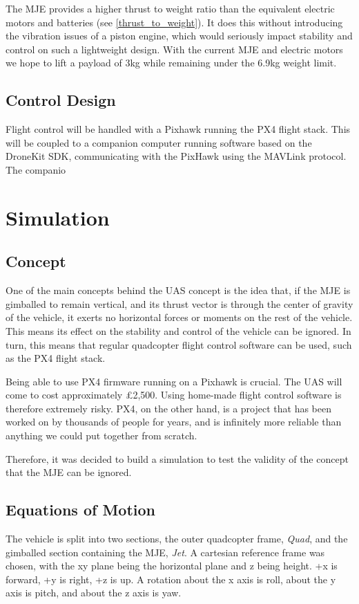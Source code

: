 \documentclass[11pt]{article}
\begin{document}
The MJE provides a higher thrust to weight ratio than the equivalent electric motors and batteries (see \ref{thrust_to_weight}). It does this without introducing the vibration issues of a piston engine, which would seriously impact stability and control on such a lightweight design. With the current MJE and electric motors we hope to lift a payload of 3kg while remaining under the 6.9kg weight limit.
\subsection{Control Design}
Flight control will be handled with a Pixhawk running the PX4 flight stack. This will be coupled to a companion computer running software based on the DroneKit SDK, communicating with the PixHawk using the MAVLink protocol. The companio

\section{Simulation}
\subsection{Concept}
One of the main concepts behind the UAS concept is the idea that, if the MJE is gimballed to remain vertical, and its thrust vector is through the center of gravity of the vehicle, it exerts no horizontal forces or moments on the rest of the vehicle. This means its effect on the stability and control of the vehicle can be ignored. In turn, this means that regular quadcopter flight control software can be used, such as the PX4 flight stack.

Being able to use PX4 firmware running on a Pixhawk is crucial. The UAS will come to cost approximately \pounds2,500. Using home-made flight control software is therefore extremely risky. PX4, on the other hand, is a project that has been worked on by thousands of people for years, and is infinitely more reliable than anything we could put together from scratch.

Therefore, it was decided to build a simulation to test the validity of the concept that the MJE can be ignored.

\subsection{Equations of Motion}
The vehicle is split into two sections, the outer quadcopter frame, \emph{Quad}, and the gimballed section containing the MJE, \emph{Jet}. A cartesian reference frame was chosen, with the xy plane being the horizontal plane and z being height. +x is forward, +y is right, +z is up. A rotation about the x axis is roll, about the y axis is pitch, and about the z axis is yaw.
\end{document}
